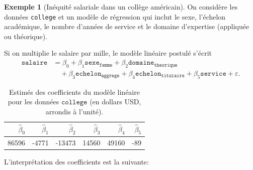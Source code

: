 \documentclass[
  11pt,
  letterpaper,
]{article}
\theoremstyle{definition}
\theoremstyle{definition}
\newtheorem{example}{Exemple}[section]
\theoremstyle{definition}
\theoremstyle{remark}
\begin{document}
\begin{example}[Inéquité salariale dans un collège américain]
\protect\hypertarget{exm:inequite-salariale}{}{\label{exm:inequite-salariale} {} }On considère les données \texttt{college} et un modèle de régression qui inclut le sexe, l'échelon académique, le nombre d'années de service et le domaine d'expertise (appliquée ou théorique).
\end{example}

Si on multiplie le salaire par mille, le modèle linéaire postulé s'écrit
\begin{align*}
\texttt{salaire} &= \beta_0 + \beta_1 \texttt{sexe}_{\texttt{femme}} +\beta_2 \texttt{domaine}_{\texttt{theorique}} \\&\quad +\beta_3 \texttt{echelon}_{\texttt{aggrege}}
+\beta_4 \texttt{echelon}_{\texttt{titulaire}}  +\beta_5 \texttt{service} + \varepsilon.
\end{align*}

\begin{table}

\caption{\label{tab:collegecoefs}Estimés des coefficients du modèle linéaire pour les données $\texttt{college}$ (en dollars USD, arrondis à l'unité).}
\centering
\begin{tabular}[t]{rrrrrr}
\toprule
$\widehat{\beta}_0$ & $\widehat{\beta}_1$ & $\widehat{\beta}_2$ & $\widehat{\beta}_3$ & $\widehat{\beta}_4$ & $\widehat{\beta}_5$\\
\midrule
86596 & -4771 & -13473 & 14560 & 49160 & -89\\
\bottomrule
\end{tabular}
\end{table}

L'interprétation des coefficients est la suivante:
\end{document}
